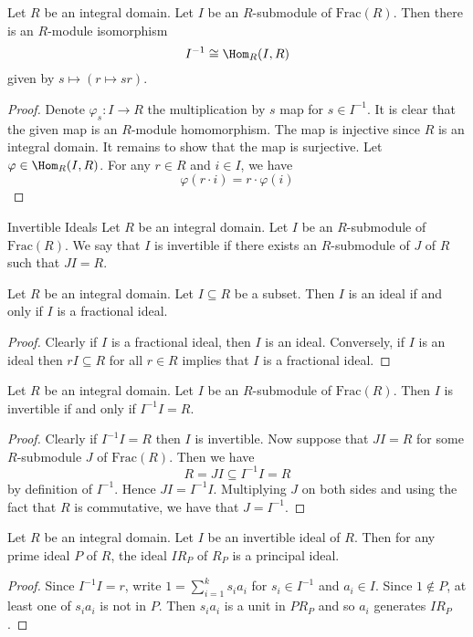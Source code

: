 \documentclass[a4paper]{article}
\begin{document}
\begin{lmm}{}{} Let $R$ be an integral domain. Let $I$ be an $R$-submodule of $\text{Frac}(R)$. Then there is an $R$-module isomorphism $$I^{-1}\cong\Hom_R(I,R)$$ given by $s\mapsto(r\mapsto sr)$. 
\begin{proof}
Denote $\varphi_s:I\to R$ the multiplication by $s$ map for $s\in I^{-1}$. It is clear that the given map is an $R$-module homomorphism. The map is injective since $R$ is an integral domain. It remains to show that the map is surjective. Let $\varphi\in\Hom_R(I,R)$. For any $r\in R$ and $i\in I$, we have $$\varphi(r\cdot i)=r\cdot\varphi(i)$$
\end{proof}
\end{lmm}

\begin{defn}{Invertible Ideals}{} Let $R$ be an integral domain. Let $I$ be an $R$-submodule of $\text{Frac}(R)$. We say that $I$ is invertible if there exists an $R$-submodule of $J$ of $R$ such that $JI=R$. 
\end{defn}

\begin{lmm}{}{} Let $R$ be an integral domain. Let $I\subseteq R$ be a subset. Then $I$ is an ideal if and only if $I$ is a fractional ideal. 
\begin{proof}
Clearly if $I$ is a fractional ideal, then $I$ is an ideal. Conversely, if $I$ is an ideal then $rI\subseteq R$ for all $r\in R$ implies that $I$ is a fractional ideal. 
\end{proof}
\end{lmm}

\begin{prp}{}{} Let $R$ be an integral domain. Let $I$ be an $R$-submodule of $\text{Frac}(R)$. Then $I$ is invertible if and only if $I^{-1}I=R$. 
\begin{proof}
Clearly if $I^{-1}I=R$ then $I$ is invertible. Now suppose that $JI=R$ for some $R$-submodule $J$ of $\text{Frac}(R)$. Then we have $$R=JI\subseteq I^{-1}I=R$$ by definition of $I^{-1}$. Hence $JI=I^{-1}I$. Multiplying $J$ on both sides and using the fact that $R$ is commutative, we have that $J=I^{-1}$. 
\end{proof}
\end{prp}

\begin{lmm}{}{} Let $R$ be an integral domain. Let $I$ be an invertible ideal of $R$. Then for any prime ideal $P$ of $R$, the ideal $IR_P$ of $R_P$ is a principal ideal. 
\begin{proof}
Since $I^{-1}I=r$, write $1=\sum_{i=1}^ks_ia_i$ for $s_i\in I^{-1}$ and $a_i\in I$. Since $1\notin P$, at least one of $s_ia_i$ is not in $P$. Then $s_ia_i$ is a unit in $PR_P$ and so $a_i$ generates $IR_P$. 
\end{proof}
\end{lmm}
\end{document}
